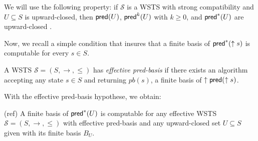 We will use the following property: if $\mathscr{S}$ is a WSTS with strong compatibility and $U \subseteq S$ is upward-closed, then $\textsf{pred}(U )$, $\textsf{pred}^k(U )$ with $k\geq0$, and $\textsf{pred}^*(U )$ are upward-closed \cite{DBLP:journals/tcs/FinkelS01}.
\iffalse
Proof. Assume $s \in \pred (I )$. Then $s \rightarrow t$ for some $t \in I $. If now $s' \geq s$ then strong upward-compatibility entails that $s' \rightarrow t'$ for some $t' \geq t$. Then $t' \in I$ and $s' \in \pred(I )$.

\mathieu{On peut probablement enlever la Proposition $8$ alors. La proposition $9$ étant plus directement pertinente pour les lemmes/preuves (permet d'avoir itérativement $\pred^k(I)$ upward-closed if $I$ upward-closed - for all $k$).}
\fi
%
Now, we recall a simple condition that insures that a finite basis of $\textsf{pred}^*(\uparrow s )$ is computable for every $s \in S$.

\begin{definition}\cite{DBLP:journals/tcs/FinkelS01,DBLP:journals/iandc/AbdullaCJT00}
A WSTS $\mathscr{S}=(S, \rightarrow, \leq)$ has {\em effective pred-basis} if there exists an algorithm accepting
any state $s \in S$ and returning $pb(s)$, a finite basis of $\uparrow \textsf{pred}(\uparrow s)$.
\end{definition}

With the effective pred-basis hypothese, we obtain:

\begin{theorem}(ref)
A finite basis of $ \textsf{pred}^*(U)$ is computable for any effective WSTS $\mathscr{S}=(S, \rightarrow, \leq)$ with effective pred-basis and any upward-closed set $U \subseteq S$ given with its finite basis $B_U$.
\end{theorem}








%
\iffalse
%
\begin{claim}{(stability of upward-closed sets)}
Let $U, V \subseteq S$ be upward-closed. Then the sets $U \cup V$, and $U \cap V$ are upward-closed.
\end{claim}
%
\fi
%

